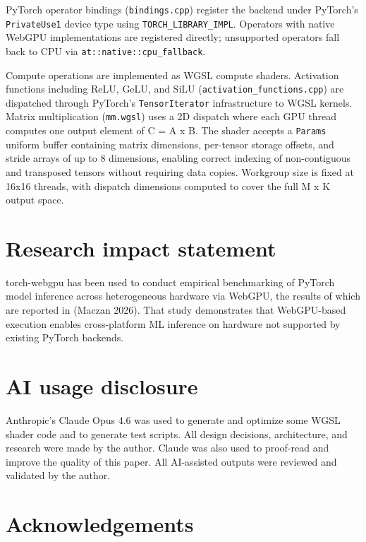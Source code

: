 PyTorch operator bindings (\texttt{bindings.cpp}) register the backend
under PyTorch's \texttt{PrivateUse1} device type using
\texttt{TORCH\_LIBRARY\_IMPL}. Operators with native WebGPU
implementations are registered directly; unsupported operators fall back
to CPU via \texttt{at::native::cpu\_fallback}.

Compute operations are implemented as WGSL compute shaders. Activation
functions including ReLU, GeLU, and SiLU
(\texttt{activation\_functions.cpp}) are dispatched through PyTorch's
\texttt{TensorIterator} infrastructure to WGSL kernels. Matrix
multiplication (\texttt{mm.wgsl}) uses a 2D dispatch where each GPU
thread computes one output element of C = A x B. The shader accepts a
\texttt{Params} uniform buffer containing matrix dimensions, per-tensor
storage offsets, and stride arrays of up to 8 dimensions, enabling
correct indexing of non-contiguous and transposed tensors without
requiring data copies. Workgroup size is fixed at 16x16 threads, with
dispatch dimensions computed to cover the full M x K output space.

\section{Research impact statement}\label{research-impact-statement}

torch-webgpu has been used to conduct empirical benchmarking of PyTorch
model inference across heterogeneous hardware via WebGPU, the results of
which are reported in (Maczan 2026). That study demonstrates that
WebGPU-based execution enables cross-platform ML inference on hardware
not supported by existing PyTorch backends.

\section{AI usage disclosure}\label{ai-usage-disclosure}

Anthropic's Claude Opus 4.6 was used to generate and optimize some WGSL
shader code and to generate test scripts. All design decisions,
architecture, and research were made by the author. Claude was also used
to proof-read and improve the quality of this paper. All AI-assisted
outputs were reviewed and validated by the author.

\section{Acknowledgements}\label{acknowledgements}

